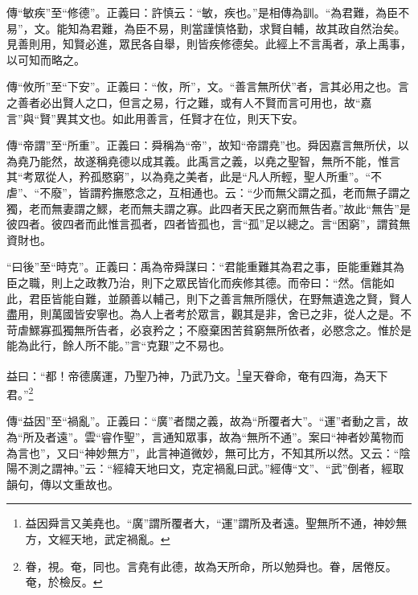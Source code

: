{\noindent\zhuan{}\fzbyks 傳“敏疾”至“修德”。正義曰：許慎云：“敏，疾也。”是相傳為訓。“為君難，為臣不易”，文。能知為君難，為臣不易，則當謹慎恪勤，求賢自輔，故其政自然治矣。見善則用，知賢必進，眾民各自舉，則皆疾修德矣。此經上不言禹者，承上禹事，以可知而略之。 \par}

{\noindent\zhuan{}\fzbyks 傳“攸所”至“下安”。正義曰：“攸，所”，文。“善言無所伏”者，言其必用之也。言之善者必出賢人之口，但言之易，行之難，或有人不賢而言可用也，故“嘉言”與“賢”異其文也。如此用善言，任賢才在位，則天下安。 \par}

{\noindent\zhuan{}\fzbyks 傳“帝謂”至“所重”。正義曰：舜稱為“帝”，故知“帝謂堯”也。舜因嘉言無所伏，以為堯乃能然，故遂稱堯德以成其義。此禹言之義，以堯之聖智，無所不能，惟言其“考眾從人，矜孤愍窮”，以為堯之美者，此是“凡人所輕，聖人所重”。“不虐”、“不廢”，皆謂矜撫愍念之，互相通也。云：“少而無父謂之孤，老而無子謂之獨，老而無妻謂之鰥，老而無夫謂之寡。此四者天民之窮而無告者。”故此“無告”是彼四者。彼四者而此惟言孤者，四者皆孤也，言“孤”足以總之。言“困窮”，謂貧無資財也。 \par}

{\noindent\shu{}\fzkt “曰後”至“時克”。正義曰：禹為帝舜謀曰：“君能重難其為君之事，臣能重難其為臣之職，則上之政教乃治，則下之眾民皆化而疾修其德。而帝曰：“然。信能如此，君臣皆能自難，並願善以輔己，則下之善言無所隱伏，在野無遺逸之賢，賢人盡用，則萬國皆安寧也。為人上者考於眾言，觀其是非，舍已之非，從人之是。不苛虐鰥寡孤獨無所告者，必哀矜之；不廢棄困苦貧窮無所依者，必愍念之。惟於是能為此行，餘人所不能。”言“克艱”之不易也。 \par}

益曰：“都！帝德廣運，乃聖乃神，乃武乃文。\footnote{益因舜言又美堯也。“廣”謂所覆者大，“運”謂所及者遠。聖無所不通，神妙無方，文經天地，武定禍亂。}皇天眷命，奄有四海，為天下君。”\footnote{眷，視。奄，同也。言堯有此德，故為天所命，所以勉舜也。眷，居倦反。奄，於檢反。}

{\noindent\zhuan{}\fzbyks 傳“益因”至“禍亂”。正義曰：“廣”者闊之義，故為“所覆者大”。“運”者動之言，故為“所及者遠”。雲“睿作聖”，言通知眾事，故為“無所不通”。案曰“神者妙萬物而為言也”，又曰“神妙無方”，此言神道微妙，無可比方，不知其所以然。又云：“陰陽不測之謂神。”云：“經緯天地曰文，克定禍亂曰武。”經傳“文”、“武”倒者，經取韻句，傳以文重故也。 \par}

